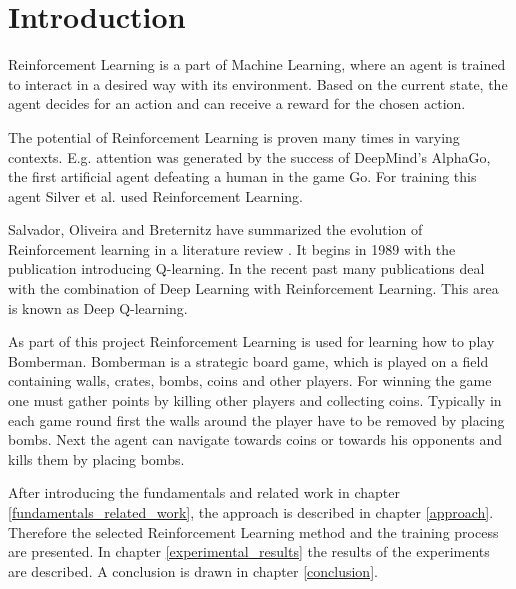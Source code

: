 \section{Introduction}

Reinforcement Learning is a part of Machine Learning, where an agent is trained to interact in a desired way with its environment. Based on the current state, the agent decides for an action and can receive a reward for the chosen action. \cite{Salvador2020}

The potential of Reinforcement Learning is proven many times in varying contexts. E.g. attention was generated by the success of DeepMind's AlphaGo, the first artificial agent defeating a human in the game Go. For training this agent Silver et al. used Reinforcement Learning. \cite{Silver1140}

Salvador, Oliveira and Breternitz have summarized the evolution of Rein\-force\-ment learning in a literature review \cite{Salvador2020}. It begins in 1989 with the publication introducing Q-learning. In the recent past many publications deal with the combination of Deep Learning with Reinforcement Learning. This area is known as Deep Q-learning.

As part of this project Reinforcement Learning is used for learning how to play Bomberman. Bomberman is a strategic board game, which is played on a field containing walls, crates, bombs, coins and other players. For winning the game one must gather points by killing other players and collecting coins. Typically in each game round first the walls around the player have to be removed by placing bombs. Next the agent can navigate towards coins or towards his opponents and kills them by placing bombs. \cite{Kormelink2018}

After introducing the fundamentals and related work in chapter \ref{fundamentals_related_work}, the approach is described in chapter \ref{approach}. Therefore the selected Reinforcement Learning method and the training process are presented. In chapter \ref{experimental_results} the results of the experiments are described. A conclusion is drawn in chapter \ref{conclusion}.